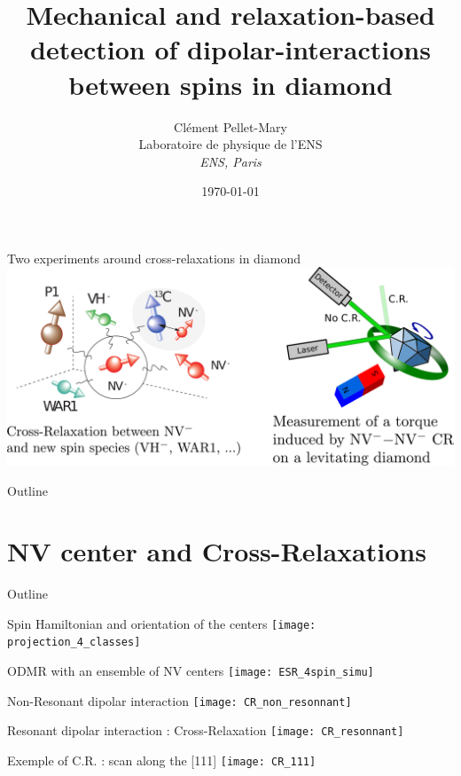 \documentclass{beamer}
\title{Mechanical and relaxation-based detection of dipolar-interactions between spins in diamond}
\author{Clément Pellet-Mary\\ Laboratoire de physique de l'ENS\\ \textit{ENS, Paris}}
\date\today
\begin{document}
\begin{frame}
\maketitle
\end{frame}
\begin{frame}{Two experiments around cross-relaxations in diamond}
\includegraphics[scale=.3]{Shémas_intro}
\end{frame}
\begin{frame}{Outline}
\tableofcontents
\end{frame}
\section{NV center and Cross-Relaxations}
\begin{frame}{Outline}
\tableofcontents[currentsection]
\end{frame}
\begin{frame}{Spin Hamiltonian and orientation of the centers}
\texttt{[image: projection\_4\_classes]}
\end{frame}
\begin{frame}{ODMR with an ensemble of NV centers}
\texttt{[image: ESR\_4spin\_simu]}
\end{frame}
\begin{frame}{Non-Resonant dipolar interaction}
\centering
\texttt{[image: CR\_non\_resonnant]}
\end{frame}
\begin{frame}{Resonant dipolar interaction : Cross-Relaxation}
\centering
\texttt{[image: CR\_resonnant]}
\end{frame}
\begin{frame}{Exemple of C.R. : scan along the [111]}
\texttt{[image: CR\_111]}
\end{frame}
\end{document}
